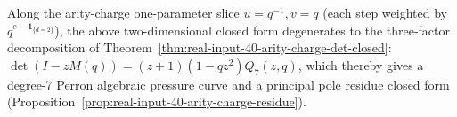 \begin{remark}\label{rem:real-input-40-zeta-uv-chi-specialization}
Along the arity-charge one-parameter slice $u=q^{-1},v=q$ (each step weighted by $q^{e-\mathbf{1}_{\{d=2\}}}$),
the above two-dimensional closed form degenerates to the three-factor decomposition of Theorem~\ref{thm:real-input-40-arity-charge-det-closed}:
\(
\det(I-zM(q))=(z+1)(1-qz^2)Q_7(z,q)
\),
which thereby gives a degree-$7$ Perron algebraic pressure curve and a principal pole residue closed form (Proposition~\ref{prop:real-input-40-arity-charge-residue}).
\end{remark}
